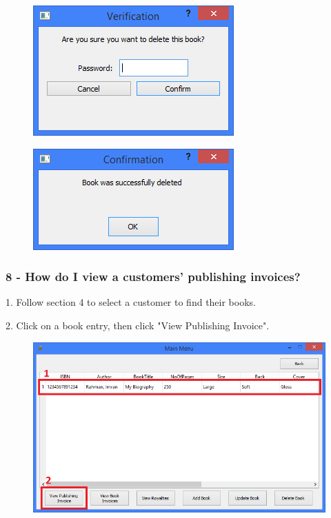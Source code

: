 \begin{figure}[H]
    \includegraphics[width=\textwidth]{./Manual/Tutorial/Q7/Verification.png}
\end{figure}

\begin{figure}[H]
    \includegraphics[width=\textwidth]{./Manual/Tutorial/Q7/Deleted.png}
\end{figure}

\subsubsection{8 -  How do I view a customers' publishing invoices?}

1. Follow section 4 to select a customer to find their books.

2. Click on a book entry, then click "View Publishing Invoice".

\begin{figure}[H]
    \includegraphics[width=\textwidth]{./Manual/Tutorial/Q8/ViewPubInvoice.png}
\end{figure}

